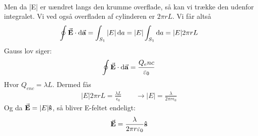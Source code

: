 \documentclass[crop=false, class=memoir]{standalone}
\begin{document}
\begin{opgave}
\begin{align*}
    \end{align*}
    Men da |E| er uændret langs den krumme overflade, så kan vi trække den udenfor integralet. Vi ved også overfladen af cylinderen er $2\pi r L$. Vi får altså
    \begin{align*}
        \oint \va E \cdot \dd{\va a} =\int_{S_1}|E|\dd{a}=|E|\int_{S_1}\dd{a}=|E|2\pi r L
    \end{align*}
    \opg
    Gauss lov siger:
    \begin{align*}
        \oint \va E \cdot \dd{\va a}=\frac{Q_enc}{\varepsilon_0}
    \end{align*}
    Hvor $Q_{enc}=\lambda L$. Dermed fås
    \begin{align*}
        |E|2\pi r L=\frac{\lambda L}{\epsilon_0} \qquad \xrightarrow{} |E|=\frac{\lambda}{2\pi r \epsilon_0}
    \end{align*}
    Og da $\va{E}=|E|\vu{s}$, så bliver E-feltet endeligt:
    \begin{align*}
        \va{E}=\frac{\lambda}{2\pi r \varepsilon_0}\vu{s}
    \end{align*}
\end{opgave}
\end{document}

